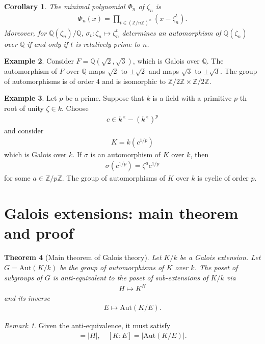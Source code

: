 \documentclass[12pt]{report}
\theoremstyle{plain}
\newtheorem{theorem}{Theorem}[section]
\newtheorem{corollary}[theorem]{Corollary}
\theoremstyle{remark}
\newtheorem*{remark}{Remark}
\theoremstyle{definition}
\newtheorem{example}[theorem]{Example}
\newcommand{\Z}{\mathbb{Z}}
\newcommand{\Q}{\mathbb{Q}}
\begin{document}
\begin{corollary}
    The minimal polynomial $\Phi_n$ of $\zeta_n$ is
    \begin{align*}
        \Phi_n(x) = \prod_{t\in (\Z/n\Z)^\times} (x-\zeta_n^t).
    \end{align*}
    Moreover, for $\Q(\zeta_n)/\Q$, $\sigma_t:\zeta_n\mapsto\zeta_n^t$ determines an automorphism of $\Q(\zeta_n)$ over $\Q$ if and only if $t$ is relatively prime to $n$.
\end{corollary}

\begin{example}
    Consider $F=\Q(\sqrt{2},\sqrt{3})$, which is Galois over $\Q$. The automorphism of $F$ over $\Q$ maps $\sqrt{2}$ to $\pm\sqrt{2}$ and maps $\sqrt{3}$ to $\pm\sqrt{3}$. The group of automorphisms is of order $4$ and is isomorphic to $\Z/2\Z\times\Z/2\Z$.
\end{example}

\begin{example}
    Let $p$ be a prime. Suppose that $k$ is a field with a primitive $p$-th root of unity $\zeta\in k$. Choose
    \begin{align*}
        c\in k^\times-(k^\times)^p
    \end{align*}
    and consider
    \begin{align*}
        K=k(c^{1/p})
    \end{align*}
    which is Galois over $k$. If $\sigma$ is an automorphism of $K$ over $k$, then
    \begin{align*}
        \sigma(c^{1/p}) = \zeta^a c^{1/p}
    \end{align*}
    for some $a\in \Z/p\Z$. The group of automorphisms of $K$ over $k$ is cyclic of order $p$.
\end{example}


\clearpage
\section{Galois extensions: main theorem and proof}

\begin{theorem}[Main theorem of Galois theory]
    Let $K/k$ be a Galois extension. Let $G=\mathrm{Aut}(K/k)$ be the group of automorphisms of $K$ over $k$. The poset of subgroups of $G$ is anti-equivalent to the poset of sub-extensions of $K/k$ via
    \begin{align*}
        H\mapsto K^H
    \end{align*}
    and its inverse
    \begin{align*}
        E\mapsto \mathrm{Aut}(K/E).
    \end{align*}
\end{theorem}
\begin{remark}
    Given the anti-equivalence, it must satisfy
    \begin{align*}
        [K:K^H]=|H|,\quad [K:E]=|\mathrm{Aut}(K/E)|.
    \end{align*}
\end{remark}
\end{document}
